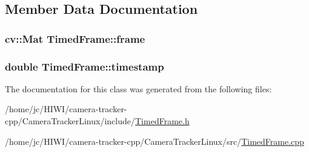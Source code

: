 \subsection{Member Data Documentation}
\subsubsection[{\texorpdfstring{frame}{frame}}]{\setlength{\rightskip}{0pt plus 5cm}cv\+::\+Mat Timed\+Frame\+::frame}\hypertarget{class_timed_frame_a4c73ac094ec94f9be6558208b4916a36}{}\label{class_timed_frame_a4c73ac094ec94f9be6558208b4916a36}
\subsubsection[{\texorpdfstring{timestamp}{timestamp}}]{\setlength{\rightskip}{0pt plus 5cm}double Timed\+Frame\+::timestamp}\hypertarget{class_timed_frame_a126b8150949e1bd734778de55496b90c}{}\label{class_timed_frame_a126b8150949e1bd734778de55496b90c}


The documentation for this class was generated from the following files\+:\begin{DoxyCompactItemize}
\item 
/home/jc/\+H\+I\+W\+I/camera-\/tracker-\/cpp/\+Camera\+Tracker\+Linux/include/\hyperlink{_timed_frame_8h}{Timed\+Frame.\+h}\item 
/home/jc/\+H\+I\+W\+I/camera-\/tracker-\/cpp/\+Camera\+Tracker\+Linux/src/\hyperlink{_timed_frame_8cpp}{Timed\+Frame.\+cpp}\end{DoxyCompactItemize}
